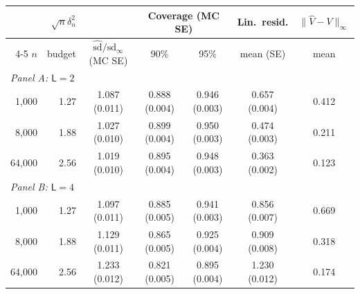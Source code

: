 \begin{tabular}{rrccccc}
\toprule
 & $\sqrt n\delta_n^2$ & & \multicolumn{2}{c}{Coverage (MC SE)} & Lin.\ resid. & $\|\hat V-V\|_\infty$ \\
\cmidrule(lr){4-5}
$n$ & budget & $\hat{\mathrm{sd}}/\mathrm{sd}_\infty$ (MC SE) & 90\% & 95\% & mean (SE) & mean \\
\midrule
\multicolumn{7}{l}{\textit{Panel A: $\mathsf L = 2$}} \\
\midrule
1,000 & 1.27 & 1.087 (0.011) & 0.888 (0.004) & 0.946 (0.003) & 0.657 (0.004) & 0.412 \\
8,000 & 1.88 & 1.027 (0.010) & 0.899 (0.004) & 0.950 (0.003) & 0.474 (0.003) & 0.211 \\
64,000 & 2.56 & 1.019 (0.010) & 0.895 (0.004) & 0.948 (0.003) & 0.363 (0.002) & 0.123 \\
\multicolumn{7}{l}{\textit{Panel B: $\mathsf L = 4$}} \\
\midrule
1,000 & 1.27 & 1.097 (0.011) & 0.885 (0.005) & 0.941 (0.003) & 0.856 (0.007) & 0.669 \\
8,000 & 1.88 & 1.129 (0.011) & 0.865 (0.005) & 0.925 (0.004) & 0.909 (0.008) & 0.318 \\
64,000 & 2.56 & 1.233 (0.012) & 0.821 (0.005) & 0.895 (0.004) & 1.230 (0.012) & 0.174 \\
\bottomrule
\end{tabular}
